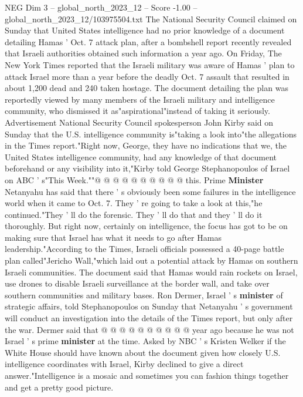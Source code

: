 \begin{textsample}{NEG Dim 3 – global\_north\_2023\_12 – Score -1.00 – global\_north\_2023\_12/103975504.txt}  \label{ex:f3_neg_236}
The National Security Council claimed on Sunday that United States intelligence had no prior knowledge of a document detailing Hamas ' Oct. 7 attack plan, after a bombshell report recently revealed that Israeli authorities obtained such information a year ago.
On Friday, The New York Times reported that the Israeli military was aware of Hamas ' plan to attack Israel more than a year before the deadly Oct. 7 assault that resulted in about 1,200 dead and 240 taken hostage.
The document detailing the plan was reportedly viewed by many members of the Israeli military and intelligence community, who dismissed it as"aspirational"instead of taking it seriously.
Advertisement National Security Council spokesperson John Kirby said on Sunday that the U.S. intelligence community is"taking a look into"the allegations in the Times report."Right now, George, they have no indications that we, the United States intelligence community, had any knowledge of that document beforehand or any visibility into it,"Kirby told George Stephanopoulos of Israel on ABC ' s"This Week.""@ @ @ @ @ @ @ @ @ @ this.
Prime \textbf{Minister} Netanyahu has said that there ' s obviously been some failures in the intelligence world when it came to Oct. 7.
They ' re going to take a look at this,"he continued."They ' ll do the forensic.
They ' ll do that and they ' ll do it thoroughly.
But right now, certainly on intelligence, the focus has got to be on making sure that Israel has what it needs to go after Hamas leadership."According to the Times, Israeli officials possessed a 40-page battle plan called"Jericho Wall,"which laid out a potential attack by Hamas on southern Israeli communities.
The document said that Hamas would rain rockets on Israel, use drones to disable Israeli surveillance at the border wall, and take over southern communities and military bases.
Ron Dermer, Israel ' s \textbf{minister} of strategic affairs, told Stephanopoulos on Sunday that Netanyahu ' s government will conduct an investigation into the details of the Times report, but only after the war.
Dermer said that @ @ @ @ @ @ @ @ @ @ year ago because he was not Israel ' s prime \textbf{minister} at the time.
Asked by NBC ' s Kristen Welker if the White House should have known about the document given how closely U.S. intelligence coordinates with Israel, Kirby declined to give a direct answer."Intelligence is a mosaic and sometimes you can fashion things together and get a pretty good picture.

\end{textsample}
